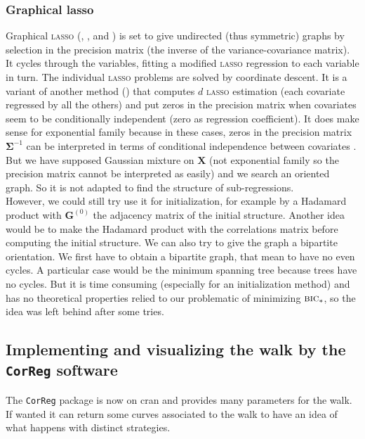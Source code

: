 \documentclass[12pt,a4paper]{report}
\begin{document}
	\subsubsection{Graphical { \sc lasso}}\label{sectionGlasso}
		Graphical \textsc{lasso} (\cite{friedman2008sparse}, \cite{witten2011new}, \cite{tibshiranilasso} and \cite{friedman2010applications}) is set to give undirected (thus symmetric) graphs by selection in the precision matrix (the inverse of the variance-covariance matrix). It cycles through the variables, fitting a modified \textsc{lasso} regression to each variable in turn. The individual \textsc{lasso} problems are solved by coordinate descent. It is a variant of another method (\cite{meinshausen2006high}) that computes $d$ \textsc{lasso} estimation (each covariate regressed by all the others) and put zeros in the precision matrix when covariates seem to be conditionally independent (zero as regression coefficient).
		It does make sense for exponential family because in these cases, zeros in the precision matrix $\boldsymbol{\Sigma}^{-1}$ can be interpreted in terms of conditional independence between covariates \cite{dempster1972covariance}. But we have supposed Gaussian mixture on $\boldsymbol{X}$ (not exponential family so the precision matrix cannot be interpreted as easily) and we search an oriented graph. So it is not adapted to find the structure of sub-regressions.\\
		
	However, we could still try use it for initialization, for example by a Hadamard product with $\boldsymbol{G}^{(0)}$ the adjacency matrix of the initial structure. Another idea would be to make the Hadamard product with the correlations matrix before computing the initial structure. We can also try to give the graph a bipartite orientation. We first have to obtain a bipartite graph, that mean to have no even cycles. A particular case would be the minimum spanning tree \cite{graham1985history,moret1991empirical,gower1969minimum} because trees have no cycles. But it is time consuming (especially for an initialization method) and has no theoretical properties relied to our problematic of minimizing $\mbox{{\sc bic}}_*$, so the idea was left behind after some tries.		

\subsection{Implementing and visualizing the walk by the {\tt CorReg} software}	
	The {\tt CorReg} package is now on {\sc cran} and provides many parameters for the walk. If wanted it can return some curves associated to the walk to have an idea of what happens with distinct strategies. 		
	
\end{document}
